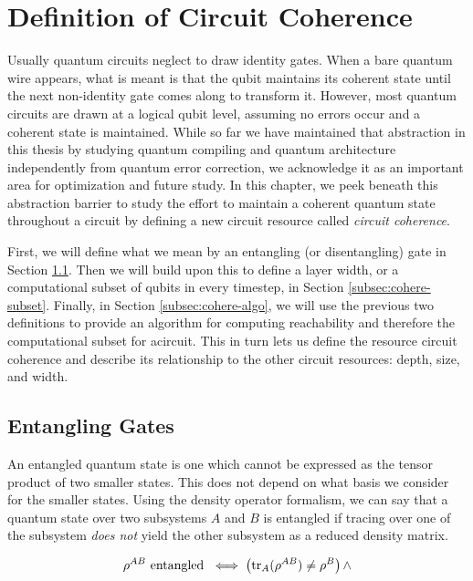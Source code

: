 \section{Definition of Circuit Coherence}
\label{sec:cohere-def}

Usually quantum circuits neglect to draw identity gates. When a bare
quantum wire appears, what is meant is that the qubit maintains its
coherent state until the next non-identity gate comes along to transform it.
However, most quantum circuits are drawn at a logical qubit level,
assuming no errors occur and a coherent state is maintained. While
so far we have maintained that abstraction in this thesis by studying
quantum compiling and quantum architecture independently from
quantum error correction, we acknowledge it as an important area for
optimization and future study. In this chapter, we peek beneath
this abstraction barrier to study
the effort to maintain a coherent quantum state throughout a circuit
by defining a new circuit resource called \emph{circuit coherence}.

First, we will define what we mean by an entangling (or disentangling) gate
in Section \ref{subsec:cohere-entangle}. Then we will build upon this
to define a layer width, or a computational subset of qubits in every
timestep, in Section \ref{subsec:cohere-subset}. Finally,
in Section \ref{subsec:cohere-algo}, we will use
the previous two definitions to provide an algorithm for
computing reachability and therefore the computational subset for acircuit.
This in turn lets us define the resource circuit coherence and
describe its relationship to the other circuit resources: depth, size, and
width. 

\subsection{Entangling Gates}
\label{subsec:cohere-entangle}

An entangled quantum state is one which cannot be expressed as the
tensor product of two smaller states. This does not depend on what basis
we consider for the smaller states. Using the density operator formalism,
we can say that a quantum state over two subsystems $A$ and $B$ is
entangled if tracing over one of the subsystem \emph{does not} yield the other subsystem
as a reduced density matrix.

\begin{equation}
\rho^{AB} \text{ entangled }
\iff \left( \text{tr}_{A}(\rho^{AB}) \ne \rho^{B} \right) \land
\end{equation}

